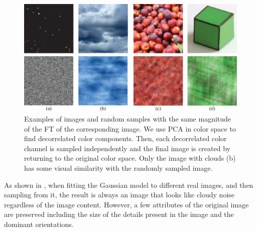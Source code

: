 

\begin{figure}
\centerline{
\includegraphics[width=1\linewidth]{figures/statistical_image_models/4_examples_images_color_FT.eps}
} 
\caption{Examples of images and random samples with the same magnitude of the FT of the corresponding image. We use PCA in color space to find decorrelated color components. Then, each decorrelated color channel is sampled independently and the final image is created by returning to the original color space. Only the image with clouds (b) has some visual similarity with the randomly sampled image.}
\label{fig:magFTMatch}
\end{figure}




As shown in \fig{\ref{fig:magFTMatch}}, when fitting the Gaussian model to different real images, and then sampling from it, the result is always an image that looks like cloudy noise regardless of the image content. However, a few attributes of the original image are preserved including the size of the details present in the image and the dominant orientations. 

